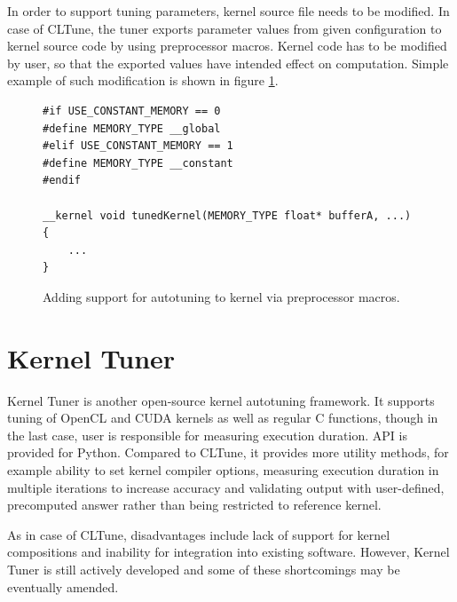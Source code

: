 \documentclass
[
    digital, %
    oneside, %
    table, %
    nolof, %
    nolot, %
    nocover %
]{fithesis3}
\begin{document}
In order to support tuning parameters, kernel source file needs to be modified. In case of CLTune, the tuner exports parameter values from given
configuration to kernel source code by using preprocessor macros. Kernel code has to be modified by user, so that the exported values have intended
effect on computation. Simple example of such modification is shown in figure \ref{cltune-example-kernel}.
\begin{figure}
\begin{lstlisting}
#if USE_CONSTANT_MEMORY == 0
#define MEMORY_TYPE __global
#elif USE_CONSTANT_MEMORY == 1
#define MEMORY_TYPE __constant
#endif

__kernel void tunedKernel(MEMORY_TYPE float* bufferA, ...)
{
    ...
}
\end{lstlisting}
\caption{Adding support for autotuning to kernel via preprocessor macros.}
\label{cltune-example-kernel}
\end{figure}

\section{Kernel Tuner}
Kernel Tuner \cite{kerneltuner} is another open-source kernel autotuning framework. It supports tuning of OpenCL and CUDA kernels as well as regular
C functions, though in the last case, user is responsible for measuring execution duration. API is provided for Python. Compared to CLTune, it
provides more utility methods, for example ability to set kernel compiler options, measuring execution duration in multiple iterations to increase
accuracy and validating output with user-defined, precomputed answer rather than being restricted to reference kernel.

As in case of CLTune, disadvantages include lack of support for kernel compositions and inability for integration into existing software. However,
Kernel Tuner is still actively developed and some of these shortcomings may be eventually amended.
\end{document}

